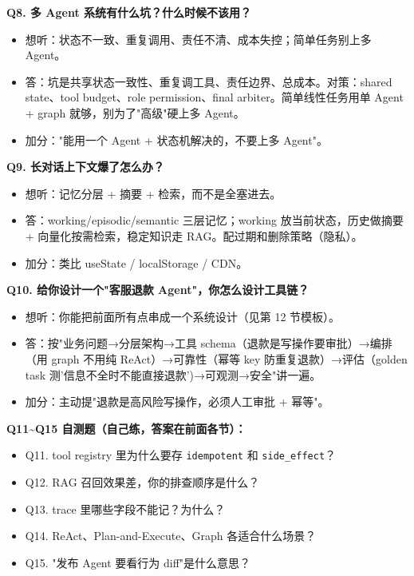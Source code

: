 \textbf{Q8. 多 Agent 系统有什么坑？什么时候不该用？}
\begin{itemize}[leftmargin=2em]
\item 想听：状态不一致、重复调用、责任不清、成本失控；简单任务别上多 Agent。
\item 答：坑是共享状态一致性、重复调工具、责任边界、总成本。对策：shared state、tool budget、role permission、final arbiter。简单线性任务用单 Agent + graph 就够，别为了"高级"硬上多 Agent。
\item 加分："能用一个 Agent + 状态机解决的，不要上多 Agent"。
\end{itemize}

\textbf{Q9. 长对话上下文爆了怎么办？}
\begin{itemize}[leftmargin=2em]
\item 想听：记忆分层 + 摘要 + 检索，而不是全塞进去。
\item 答：working/episodic/semantic 三层记忆；working 放当前状态，历史做摘要 + 向量化按需检索，稳定知识走 RAG。配过期和删除策略（隐私）。
\item 加分：类比 useState / localStorage / CDN。
\end{itemize}

\textbf{Q10. 给你设计一个"客服退款 Agent"，你怎么设计工具链？}
\begin{itemize}[leftmargin=2em]
\item 想听：你能把前面所有点串成一个系统设计（见第 12 节模板）。
\item 答：按"业务问题→分层架构→工具 schema（退款是写操作要审批）→编排（用 graph 不用纯 ReAct）→可靠性（幂等 key 防重复退款）→评估（golden task 测'信息不全时不能直接退款')→可观测→安全"讲一遍。
\item 加分：主动提"退款是高风险写操作，必须人工审批 + 幂等"。
\end{itemize}

\textbf{Q11\~{}Q15 自测题（自己练，答案在前面各节）：}
\begin{itemize}[leftmargin=2em]
\item Q11. tool registry 里为什么要存 \texttt{idempotent} 和 \texttt{side\_effect}？
\item Q12. RAG 召回效果差，你的排查顺序是什么？
\item Q13. trace 里哪些字段不能记？为什么？
\item Q14. ReAct、Plan-and-Execute、Graph 各适合什么场景？
\item Q15. "发布 Agent 要看行为 diff"是什么意思？
\end{itemize}

